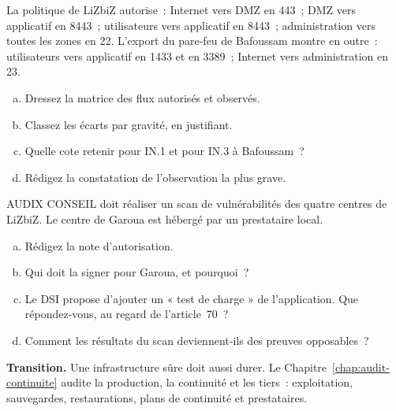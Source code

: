 \begin{boxexo}[title={\ding{45}\quad Exercice~16.2. Matrice de flux \niveaumoyen}]
La politique de LiZbiZ autorise~: Internet vers DMZ en 443~; DMZ vers
applicatif en 8443~; utilisateurs vers applicatif en 8443~; administration
vers toutes les zones en 22. L'export du pare-feu de Bafoussam montre en
outre~: utilisateurs vers applicatif en 1433 et en 3389~; Internet vers
administration en 23.
\begin{enumerate}[(a)]
    \item Dressez la matrice des flux autorisés et observés.
    \item Classez les écarts par gravité, en justifiant.
    \item Quelle cote retenir pour IN.1 et pour IN.3 à Bafoussam~?
    \item Rédigez la constatation de l'observation la plus grave.
\end{enumerate}
\end{boxexo}

\begin{boxexo}[title={\ding{45}\quad Exercice~16.3. La note d'autorisation \niveauexpert}]
AUDIX CONSEIL doit réaliser un scan de vulnérabilités des quatre centres de
LiZbiZ. Le centre de Garoua est hébergé par un prestataire local.
\begin{enumerate}[(a)]
    \item Rédigez la note d'autorisation.
    \item Qui doit la signer pour Garoua, et pourquoi~?
    \item Le DSI propose d'ajouter un « test de charge » de l'application.
          Que répondez-vous, au regard de l'article~70~?
    \item Comment les résultats du scan deviennent-ils des preuves
          opposables~?
\end{enumerate}
\end{boxexo}

\bigskip

\begin{boxinfo}
\textbf{Transition.} Une infrastructure sûre doit aussi durer. Le
Chapitre~\ref{chap:audit-continuite} audite la production, la continuité
et les tiers~: exploitation, sauvegardes, restaurations, plans de
continuité et prestataires.
\end{boxinfo}
